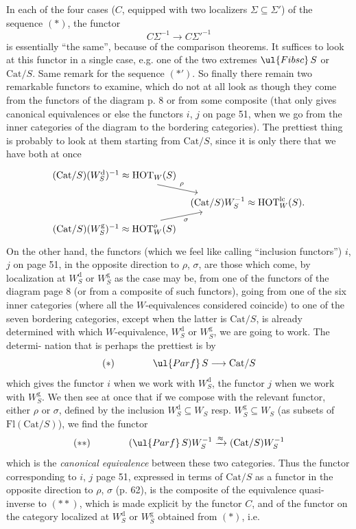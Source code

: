 In each of the four cases ($C$, equipped with two localizers $\Sigma \subseteq \Sigma'$) of the sequence $(*)$, the functor
\[C\Sigma^{-1} \longrightarrow C\Sigma'^{-1}\]
is essentially ``the same'', because of the comparison theorems. It suffices to look at this functor in a single case, e.g. one of the two extremes $\ul{Fibsc}\,S$ or $\mathrm{Cat}/S$. Same remark for the sequence $(*')$. So finally there remain two remarkable functors %
to examine, which do not at all look as though they come from the functors of the diagram p. 8 or from some composite (that only gives canonical equivalences or else the functors $i$, $j$ on page 51, when we go from the inner categories of the diagram to the bordering categories). The prettiest thing is probably to look at them starting from $\mathrm{Cat}/S$, since it is only there that we have both at once
\[
\begin{tikzcd}[row sep=small, column sep=tiny]
(\mathrm{Cat}/S)(W_S^{\mathrm{d}})^{-1} \approx \mathrm{HOT}_W(S) \arrow[dr, "\rho"] & \\
& (\mathrm{Cat}/S)W_S^{-1} \approx \mathrm{HOT}_W^{\mathrm{lc}}(S). \\
(\mathrm{Cat}/S)(W_S^{\mathrm{g}})^{-1} \approx \mathrm{HOT}_W^{o}(S) \arrow[ur, "\sigma"'] &
\end{tikzcd}
\]
On the other hand, the functors (which we feel like calling ``inclusion functors'') $i$, $j$ on page 51, in the opposite direction to $\rho$, $\sigma$, are those which come, by localization at $W_S^{\mathrm{d}}$ or $W_S^{\mathrm{g}}$ as the case may be, from one of the functors of the diagram page 8 (or from a composite of such functors), going from one of the six inner categories (where all the $W$-equivalences considered coincide) to one of the seven bordering categories, except when the latter is $\mathrm{Cat}/S$, is already determined with which $W$-equivalence, $W_S^{\mathrm{d}}$ or $W_S^{\mathrm{g}}$, we are going to work. The determi-%
nation that is perhaps the prettiest is by
\[(*) \qquad\qquad \ul{Parf}\,S \longrightarrow \mathrm{Cat}/S\]
which gives the functor $i$ when we work with $W_S^{\mathrm{d}}$, the functor $j$ when we work with $W_S^{\mathrm{g}}$. We then see at once that if we compose with the relevant functor, either $\rho$ or $\sigma$, defined by the inclusion $W_S^{\mathrm{d}} \subseteq W_S$ resp. $W_S^{\mathrm{g}} \subseteq W_S$ (as subsets of $\mathrm{Fl}(\mathrm{Cat}/S)$), we find the functor
\[(**) \qquad\qquad (\ul{Parf}\,S)W_S^{-1} \xrightarrow{\approx} (\mathrm{Cat}/S)W_S^{-1}\]
which is the \textit{canonical equivalence} between these two categories. Thus the functor corresponding to $i$, $j$ page 51, expressed in terms of $\mathrm{Cat}/S$ as a functor in the opposite direction to $\rho$, $\sigma$ (p. 62), is the composite of the equivalence quasi-inverse to $(**)$, which is made explicit by the functor $C$, and of the functor on the category localized at $W_S^{\mathrm{d}}$ or $W_S^{\mathrm{g}}$ obtained from $(*)$, i.e.